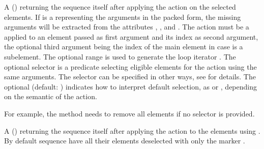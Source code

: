 \documentclass[letterpaper,10pt,english]{sphinxmanual}
\begin{document}
\begin{description}
\sphinxAtStartPar
A  () returning the sequence itself after applying the action  on the selected elements. If 
is a  representing the arguments in the packed form, the missing arguments will be extracted from the attributes ,
,  and . The action  must be a   applied to an element passed as
first argument and its index as second argument, the optional third argument being the index of the main element in case  is a sub\sphinxhyphen{}element.
The optional range is used to generate the loop iterator . The optional selector  is a  
predicate selecting eligible elements for the action using the same arguments. The selector  can be specified in other ways,
see {\hyperref[\detokenize{sequences:element-selections}]{}} for details. The optional   (default: ) indicates how to interpret default selection, as
 or , depending on the semantic of the action. %
\begin{footnote}[2]\sphinxAtStartFootnote
For example, the  method needs  to  remove all elements if no selector is provided.
%
\end{footnote}

\sphinxAtStartPar
A  (\sphinxcode{\sphinxupquote{{[}flg{]}, {[}rng{]}, {[}sel{]}, {[}not{]}}}) returning the sequence itself after applying the action  to the elements using
. By default sequence have all their elements deselected with only the  marker .


\end{description}
\end{document}
